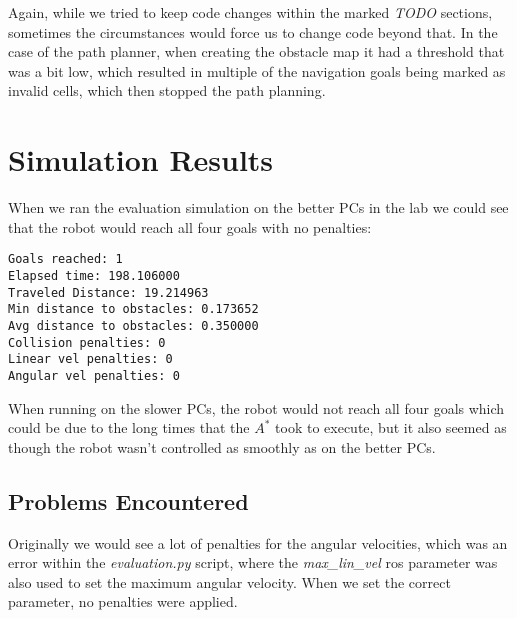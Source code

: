 \documentclass[
	fontsize=12pt,
	headings=small,
	parskip=half,           %
	bibliography=totoc,
	numbers=noenddot,       %
	open=any,               %
]{scrreprt}
\begin{document}
Again, while we tried to keep code changes within the marked \emph{TODO} sections, sometimes the circumstances would force us to change code beyond that. 
In the case of the path planner, when creating the obstacle map it had a threshold that was a bit low, which resulted in multiple of the navigation goals being marked as invalid cells, which then stopped the path planning.


\chapter{Simulation Results}
When we ran the evaluation simulation on the better PCs in the lab we could see that the robot would reach all four goals with no penalties:
\begin{lstlisting}[language={},caption={metrics.txt}]
Goals reached: 1
Elapsed time: 198.106000
Traveled Distance: 19.214963
Min distance to obstacles: 0.173652
Avg distance to obstacles: 0.350000
Collision penalties: 0
Linear vel penalties: 0
Angular vel penalties: 0
\end{lstlisting}

When running on the slower PCs, the robot would not reach all four goals which could be due to the long times that the $A^*$ took to execute, but it also seemed as though the robot wasn't controlled as smoothly as on the better PCs.

\section{Problems Encountered}

Originally we would see a lot of penalties for the angular velocities, which was an error within the \emph{evaluation.py} script, where the \emph{max\_lin\_vel} ros parameter was also used to set the maximum angular velocity.
When we set the correct parameter, no penalties were applied.
\end{document}
